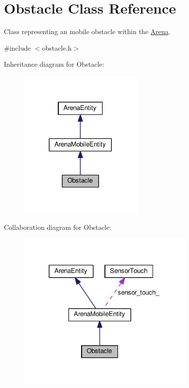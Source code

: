 \hypertarget{classObstacle}{}\section{Obstacle Class Reference}
\label{classObstacle}


Class representing an mobile obstacle within the \hyperlink{classArena}{Arena}.  




{\ttfamily \#include $<$obstacle.\+h$>$}



Inheritance diagram for Obstacle\+:
\nopagebreak
\begin{figure}[H]
\begin{center}
\leavevmode
\includegraphics[width=176pt]{classObstacle__inherit__graph}
\end{center}
\end{figure}


Collaboration diagram for Obstacle\+:
\nopagebreak
\begin{figure}[H]
\begin{center}
\leavevmode
\includegraphics[width=250pt]{classObstacle__coll__graph}
\end{center}
\end{figure}
